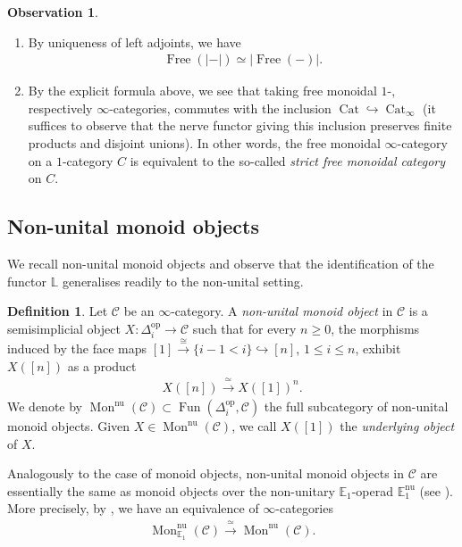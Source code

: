 \documentclass[12pt, reqno]{amsart}
\theoremstyle{plain}
\theoremstyle{definition}
\newtheorem{definition}[theorem]{Definition}
\newtheorem{observation}[theorem]{Observation}
\begin{document}
\begin{observation}\label{observations about free objects}
\ 
\begin{enumerate}
\item By uniqueness of left adjoints, we have
\begin{align*}
\operatorname{Free}(|-|)\simeq |\operatorname{Free}(-)|.
\end{align*}
\item By the explicit formula above, we see that taking free monoidal $1$-, respectively $\infty$-categories, commutes with the inclusion $\operatorname{Cat}\hookrightarrow \operatorname{Cat}_\infty$ (it suffices to observe that the nerve functor giving this inclusion preserves finite products and disjoint unions). In other words, the free monoidal $\infty$-category on a $1$-category $C$ is equivalent to the so-called \textit{strict free monoidal category} on $C$.\qedhere
\end{enumerate}
\end{observation}




\subsection{Non-unital monoid objects}\label{non-unital monoids}

We recall non-unital monoid objects and observe that the identification of the functor $\mathbb{L}$ generalises readily to the non-unital setting.

\begin{definition}
Let $\mathcal{C}$ be an $\infty$-category. A \textit{non-unital monoid object} in $\mathcal{C}$ is a semisimplicial object $X\colon \Delta_i^{\operatorname{op}}\rightarrow \mathcal{C}$ such that for every $n\geq 0$, the morphisms induced by the face maps $[1]\xrightarrow{\cong} \{i-1<i\}\hookrightarrow [n]$, $1\leq i\leq n$, exhibit $X([n])$ as a product
\begin{align*}
X([n])\xrightarrow{\ \simeq\ } X([1])^n.
\end{align*}
We denote by $\operatorname{Mon}^{\operatorname{nu}}(\mathcal{C})\subset \operatorname{Fun}(\Delta^{\operatorname{op}}_i,\mathcal{C})$ the full subcategory of non-unital monoid objects. Given $X\in \operatorname{Mon}^{\operatorname{nu}}(\mathcal{C})$, we call $X([1])$ the \textit{underlying object} of $X$.
\end{definition}

Analogously to the case of monoid objects, non-unital monoid objects in $\mathcal{C}$ are essentially the same as monoid objects over the non-unitary $\mathbb{E}_1$-operad $\mathbb{E}_1^{\operatorname{nu}}$ (see \cite[5.4.4.1]{LurieHA}). More precisely, by \cite[Corollary 4.1.2.14]{LurieHA}, we have an equivalence of $\infty$-categories
\begin{align*}
\operatorname{Mon}^{\operatorname{nu}}_{\mathbb{E}_1}(\mathcal{C})\xrightarrow{\ \simeq \ }\operatorname{Mon}^{\operatorname{nu}}(\mathcal{C}).
\end{align*}
\end{document}
